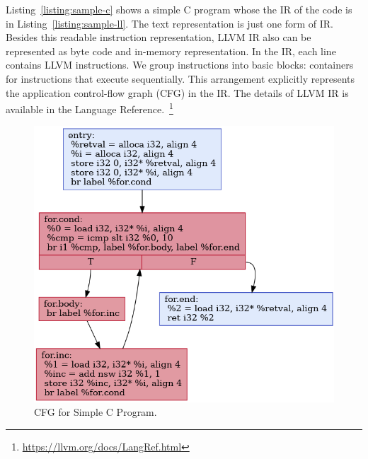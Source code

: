 Listing~\ref{listing:sample-c} shows a simple C program whose the IR of the code
is in Listing~\ref{listing:sample-ll}. The text representation is just one form
of IR. Besides this readable instruction representation, LLVM IR also can be
represented as byte code and in-memory representation. In the IR, each line
contains LLVM instructions. We group instructions into basic blocks: containers
for instructions that execute sequentially. This arrangement explicitly
represents the application control-flow graph (CFG) in the IR. The details of
LLVM IR is available in the Language
Reference.~\footnote{\url{https://llvm.org/docs/LangRef.html}}



\begin{figure}[ht]
    \centerline{\includegraphics[scale=.75]{Figures/03/cfg.png}}
    \caption{CFG for Simple C Program.}
    \label{fig:cfg}
\end{figure}


